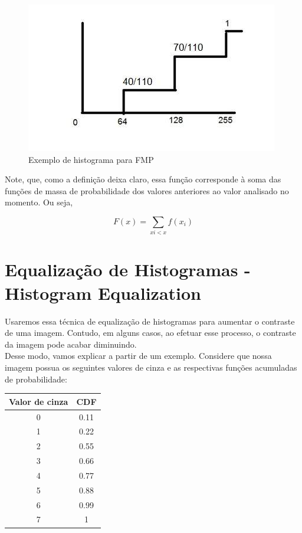 \documentclass[a4paper, 12pt]{article}
\begin{document}
\begin{enumerate}
	\begin{figure}[!htbp]
		\centering
		\includegraphics[scale=0.5]{images/prob3.jpg}
		\caption{Exemplo de histograma para FMP}
	\end{figure}
	
	Note, que, como a definição deixa claro, essa função corresponde à soma das funções de massa de probabilidade dos valores anteriores ao valor analisado 
	no momento. Ou seja, 
	\begin{center}
		\[F(x) = \sum_{xi<x}{f(x_i)} \]
	\end{center}
\end{enumerate}

\section{Equalização de Histogramas - Histogram Equalization}
Usaremos essa técnica de equalização de histogramas para aumentar o contraste de uma imagem. Contudo, em alguns casos, ao efetuar esse processo, 
o contraste da imagem pode acabar diminuindo.
\\

Desse modo, vamos explicar a partir de um exemplo. Considere que nossa imagem possua os seguintes valores de cinza e as respectivas funções acumuladas 
de probabilidade:

\begin{table}[!htbp]
	\centering
	\begin{tabular}{|c|c|}
	\hline
	Valor de cinza & CDF  \\ \hline
	0              & 0.11 \\ \hline
	1              & 0.22 \\ \hline
	2              & 0.55 \\ \hline
	3              & 0.66 \\ \hline
	4              & 0.77 \\ \hline
	5              & 0.88 \\ \hline
	6              & 0.99 \\ \hline
	7              & 1    \\ \hline
	\end{tabular}
\end{table}
\end{document}
